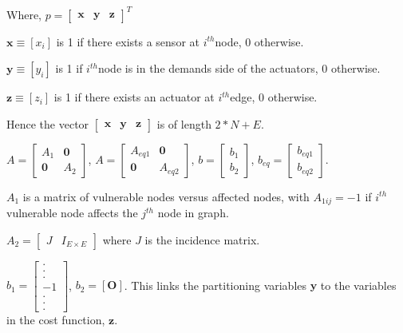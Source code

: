 \documentclass[authoryear,preprint,review,12pt]{elsarticle}
\begin{document}
Where, $  p=\begin{bmatrix}
 \mathbf{x} & \mathbf{y} & \mathbf{z} \end{bmatrix}^{T}$

$\mathbf{x}\equiv[x_{i}]$ is 1 if there exists a sensor at
$i^{th}$node, 0 otherwise.

$\mathbf{y}\equiv[y_{i}]$ is 1 if $i^{th}$node is in the demands
side of the actuators, 0 otherwise.

$\mathbf{z}\equiv[z_{i}]$ is 1 if there exists an actuator at $i^{th}$edge,
0 otherwise.

Hence the vector $\left[\mathbf{\begin{array}{ccc}
\mathbf{x} & \mathbf{y} & \mathbf{z}\end{array}}\right]$ is of length $2*N+E$. %

$A=\left[\begin{array}{cc}
A_{1} & \mathbf{0}\\
\mathbf{0} & A_{2}
\end{array}\right]$, $A=\left[\begin{array}{cc}
A_{eq1} & \mathbf{0}\\
\mathbf{0} & A_{eq2}
\end{array}\right]$, $b=\left[\begin{array}{c}
b_{1}\\
b_{2}
\end{array}\right]$, $b_{eq}=\left[\begin{array}{c}
b_{eq1}\\
b_{eq2}
\end{array}\right]$.

$A_{1}$ is a matrix of vulnerable nodes versus affected nodes, with
$A_{1ij}=-1$ if $i^{th}$ vulnerable node affects the $j^{th}$ node
in graph.

$A_{2}=\left[\begin{array}{cc}

J & I_{E\times E}\end{array}\right]$ where $J$ is the incidence matrix.


$b_{1}=\left[\begin{array}{c}
.\\
.\\
.\\
-1\\
.\\
.\\
.
\end{array}\right]$,
$b_{2}=\left[\mathbf{O}\right]$. This links the partitioning variables
$\mathbf{y}$ to the variables in the cost function, $\mathbf{z}$.
\end{document}
